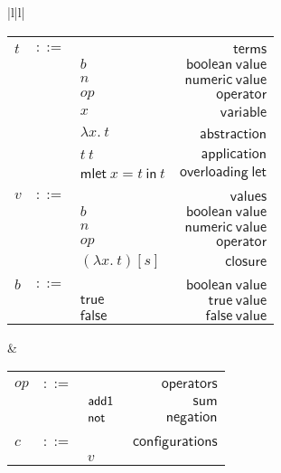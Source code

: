 \documentclass[preprint,authoryear,sort&compress,9pt,nocopyrightspace]{article}
\newcommand{\conf}[2][s]{(#2)[#1]}
\newcommand{\ascrip}[1]{#1::T}
\newcommand{\oletD}{\mathsf{mlet} \ x = t \ \mathsf{in}  \ t}
\newcommand{\app}[2]{#1 \ #2}
\newcommand{\absST}[2]{\lambda #1. \ #2}
\newcommand{\negacion}[1]{\mathsf{not} \ #1}
\newcommand{\suma}[1]{\mathsf{add1} \ #1}
\newcommand{\truet}{\mathsf{true}}
\newcommand{\falset}{\mathsf{false}}
\begin{document}
\setlength{\topmargin}{-25mm}
\setlength{\textheight}{230mm}
\begin{figure}[h]
\begin{small}
\begin{center}
\hspace*{-2cm}
\begin{tabular}{|l|l|}
\hline
\begin{tabular}{l c l r}
&&&\\
$t$&$::=$&&$\mathsf {terms}$\\
&&$b$&$\mathsf {boolean \ value}$\\
&&$n$&$\mathsf {numeric \ value}$\\
&&$op$&$\mathsf{operator}$\\
&&$x$&$\mathsf {variable}$\\
&&$\absST {x}{t}$&\ $\mathsf {abstraction}$\\
&&$\app {t}{t}$&$\mathsf {application}$\\
&&$\oletD$&$\mathsf {overloading \ let}$\\
&&&\\
$v$&$::=$&&$\mathsf {values}$\\
&&$b$&$\mathsf {boolean \ value}$\\
&&$n$&$\mathsf{numeric \ value} $\\
&&$op$&$\mathsf{operator}$\\
&&$\conf{\absST {x}{t}}$&$\mathsf{closure}$\\
&&&\\
$b$&$::=$&&$\mathsf {boolean \ value}$\\
&&$\truet$&$\mathsf {true \ value}$\\
&&$\falset$&$\mathsf {false \ value}$\\
\end{tabular}
& \begin{tabular}{l c l r}
&&&\\
$op$&$::=$&&$\mathsf {operators}$\\
&&$\suma$&$\mathsf {sum}$\\
&&$\negacion$&$\mathsf{negation} $\\
&&&\\
$c$&$::=$&&$\mathsf {configurations}$\\
&&$v$&\\

\end{tabular}
\end{tabular}
\end{center}
\end{small}
\end{figure}
\end{document}
